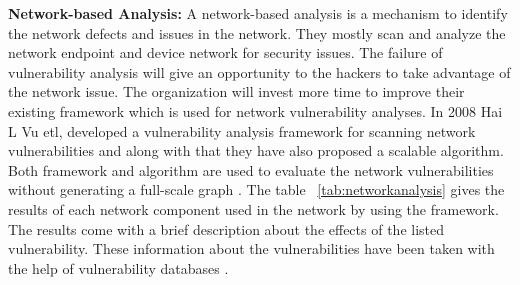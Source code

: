 {\bf Network-based Analysis:} A network-based analysis is a mechanism to identify the network defects and issues in the network. They mostly scan and analyze the network endpoint and device network for security issues. The failure of vulnerability analysis will give an opportunity to the hackers to take advantage of the network issue. The organization will invest more time to improve their existing framework which is used for network vulnerability analyses. In 2008 Hai L Vu etl, developed a vulnerability analysis framework for scanning network vulnerabilities and along with that they have also proposed a scalable algorithm. Both framework and algorithm are used to evaluate the network vulnerabilities without generating a full-scale graph \cite{VuKhChFe2008}. The table ~\ref{tab:networkanalysis} gives the results of each network component used in the network by using the framework. The results come with a brief description about the effects of the listed vulnerability. These information about the vulnerabilities have been taken with the help of vulnerability databases \cite{VuKhChFe2008}.
